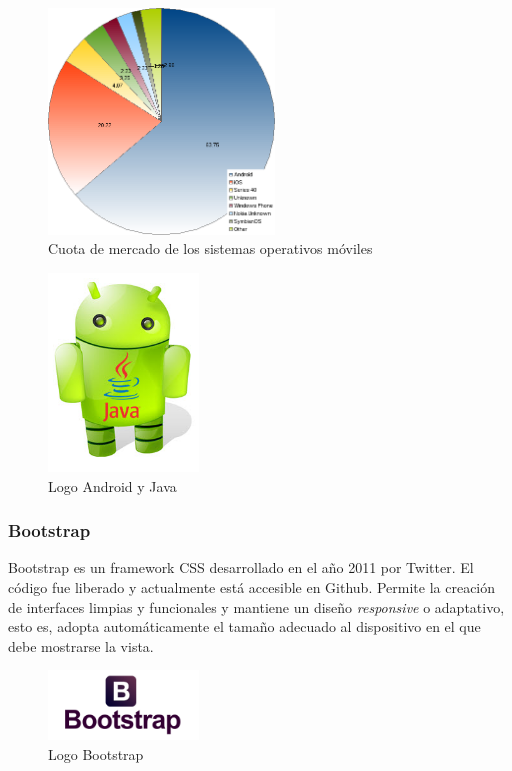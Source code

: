 		\begin{figure}[h!btp]
		\centering
		\includegraphics[width=60mm, fbox={\fboxrule} 4mm]{images/04-metodo/09-os_mobile.png}
		\caption{Cuota de mercado de los sistemas operativos móviles}
		\label{fig:os-mobile}
		\end{figure}
		
		\begin{figure}[H]
		\centering
		\includegraphics[width=40mm, fbox={\fboxrule} 4mm]{images/04-metodo/10-android_java.jpg}
		\caption{Logo Android y Java}
		\label{fig:android-java-logo}
		\end{figure}

		\subsubsection{Bootstrap}
		Bootstrap es un framework \ac{CSS} desarrollado en el año 2011 por Twitter. El código fue liberado y actualmente está accesible en Github. Permite la creación de interfaces limpias y funcionales y mantiene un diseño \textit{responsive} o adaptativo, esto es, adopta automáticamente el tamaño adecuado al dispositivo en el que debe mostrarse la vista.
		
		\begin{figure}[H]
		\centering
		\includegraphics[width=40mm, fbox={\fboxrule} 4mm]{images/04-metodo/23-bootstrap_logo.png}
		\caption{Logo Bootstrap}
		\label{fig:bootstrap-logo}
		\end{figure}
		
